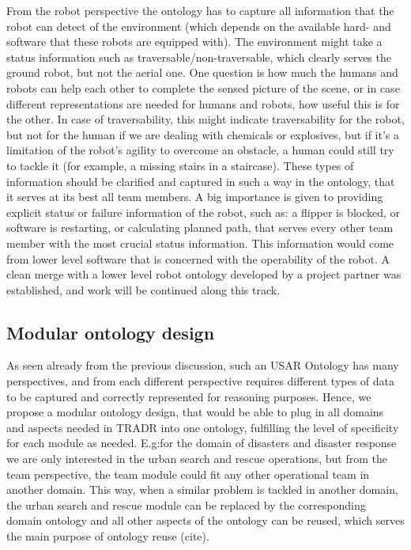 \begin{itemize}
\begin{itemize}
From the robot perspective the ontology has to capture all information that the robot can detect of the environment (which depends on the available hard- and software that these robots are equipped with). The environment might take a status information such as traversable/non-traversable, which clearly serves the ground robot, but not the aerial one. One question is how much the humans and robots can help each other to complete the sensed picture of the scene, or in case different representations are needed for humans and robots, how useful this is for the other. In case of traversability, this might indicate traversability for the robot, but not for the human if we are dealing with chemicals or explosives, but if it's a limitation of the robot's agility to overcome an obstacle, a human could still try to tackle it (for example, a missing stairs in a staircase). These types of information should be clarified and captured in such a way in the ontology, that it serves at its best all team members.
A big importance is given to providing explicit status or failure information of the robot, such as: a flipper is blocked, or software is restarting, or calculating planned path, that serves every other team member with the most crucial status information. This information would come from lower level software that is concerned with the operability of the robot. A clean merge with a lower level robot ontology developed by a project partner was established, and work will be continued along this track.
\end{itemize}


\subsection{Modular ontology design}

As seen already from the previous discussion, such an USAR Ontology has many perspectives, and from each different perspective requires different types of data to be captured and correctly represented for reasoning purposes. Hence, we propose a modular ontology design, that would be able to plug in all domains and aspects needed in TRADR into one ontology, fulfilling the level of specificity for each module as needed. E.g:for the domain of disasters and disaster response we are only interested in the urban search and rescue operations, but from the team perspective, the team module could fit any other operational team in another domain. This way, when a similar problem is tackled in another domain, the urban search and rescue module can be replaced by the corresponding domain ontology and all other aspects of the ontology can be reused, which serves the main purpose of ontology reuse (cite).



\end{itemize}
